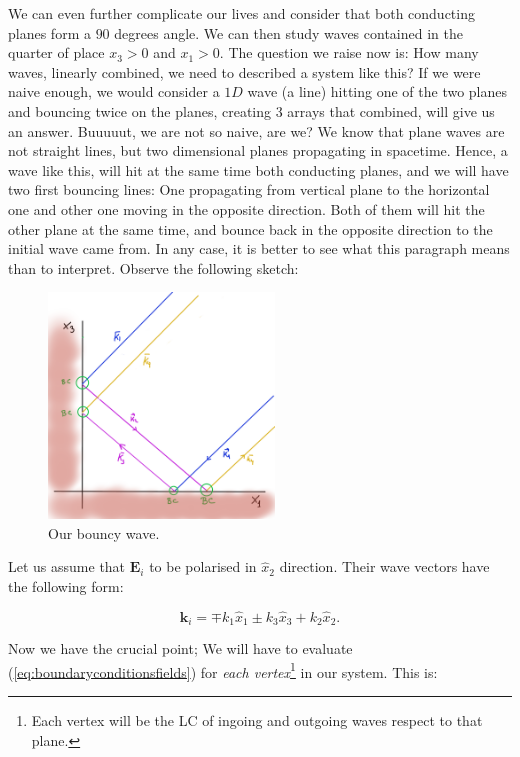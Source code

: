 We can even further complicate our lives and consider that both conducting planes form a $90$ degrees angle. We can then study waves contained in the quarter of place $x_{3} >0$ and $x_{1}>0$. The question we raise now is: How many waves, linearly combined, we need to described a system like this? If we were naive enough, we would consider a $1D$ wave (a line) hitting one of the two planes and bouncing twice on the planes, creating 3 arrays that combined, will give us an answer. Buuuuut, we are not so naive, are we? We know that plane waves are not straight lines, but two dimensional planes propagating in spacetime. Hence, a wave like this, will hit at the same time both conducting planes, and we will have two first bouncing lines: One propagating from vertical plane to the horizontal one  and other one moving in the opposite direction. Both of them will hit the other plane at the same time, and bounce back in the opposite direction to the initial wave came from. In any case, it is better to see what this paragraph means than to interpret. Observe the following sketch:

\begin{figure}[h!]
	\includegraphics[width=6cm]{figures/X1x3plane.png}
	\centering
	\caption{Our bouncy wave.}
\end{figure}

Let us assume that $\mathbf{E}_{i}$ to be polarised in $\hat{x}_{2}$ direction. Their wave vectors have the following form:

\begin{equation}
	\mathbf{k}_{i} = \mp k_{1} \hat{x}_{1} \pm k_{3} \hat{x}_{3} + k_{2} \hat{x}_{2}.
\end{equation}

Now we have the crucial point; We will have to evaluate (\ref{eq:boundaryconditionsfields}) for \textit{each vertex}\footnote{Each vertex will be the LC of ingoing and outgoing waves respect to that plane.} in our system. This is:
		
